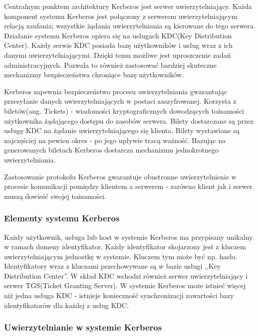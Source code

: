 			Centralnym punktem architektury Kerberos jest serwer uwierzytelniający\cite{Garman03}. Każda komponent systemu Kerberos jest połączony z serwerem uwierzytelniającym relacją zaufania; wszystkie żądania uwierzytelniania są kierowane do tego serwera. Działanie systemu Kerberos opiera się na usługach KDC(Key Distribution Center). Każdy serwis KDC posiada bazę użytkowników i usług wraz z ich danymi uwierzytelniającymi. Dzięki temu możliwe jest uproszczenie zadań administracyjnych. Pozwala to również zastosować bardziej skuteczne mechanizmy bezpieczeństwa chroniące bazę użytkowników.

			Kerberos zapewnia bezpieczeństwo procesu uwierzytelniania gwarantując przesyłanie danych uwierzytelniających w postaci zaszyfrowanej. Korzysta z biletów(ang. Tickets) - wiadomości kryptograficznych dowodzących tożsamości użytkownika żądającego dostępu do zasobów serwera. Bilety dostarczane są przez usługę KDC na żądanie uwierzytelniającego się klienta. Bilety wystawiane są najczęściej na pewien okres - po jego upływie tracą ważność. Bazując na generowanych biletach Kerberos dostarcza mechanizmu jednokrotnego uwierzytelniania. 

			Zastosowanie protokołu Kerberos gwarantuje obustronne uwierzytelnienie w procesie komunikacji pomiędzy klientem a serwerem - zarówno klient jak i serwer muszą dowieść swojej tożsamości. 

		\subsubsection{Elementy systemu Kerberos}

			Każdy użytkownik, usługa lub host w systemie Kerberos ma przypisany unikalny w ramach domeny identyfikator\cite{Garman03}. Każdy identyfikator skojarzony jest z kluczem uwierzytelniającym jednostkę w systemie. Kluczem tym może być np. hasło. Identyfikatory wraz z kluczami przechowywane są w bazie usługi ,,Key Distribution Center''. W skład KDC wchodzi również serwer uwierzytelniający i serwer TGS(Ticket Granting Server). W systemie Kerberos może istnieć więcej niż jedna usługa KDC - istnieje konieczność synchronizacji zawartości bazy identyfikatorów dla każdej z usług KDC.

		\subsubsection{Uwierzytelnianie w systemie Kerberos}

